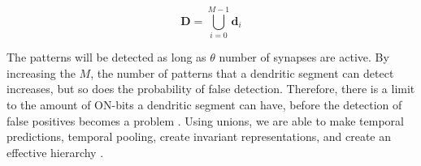 \begin{equation}
    \boldsymbol{D} = \bigcup_{i=0}^{M-1} \boldsymbol{d}_{i}
\end{equation}


The patterns will be detected as long as $\theta$ number of synapses are active. By increasing the $M$, the number of patterns that a dendritic segment can detect increases, but so does the probability of false detection. Therefore, there is a limit to the amount of ON-bits a dendritic segment can have, before the detection of false positives becomes a problem \cite{DBLP:journals/corr/AhmadH15}. Using unions, we are able to make temporal predictions, temporal pooling, create invariant representations, and create an effective hierarchy \cite{DBLP:journals/corr/AhmadH15}.








